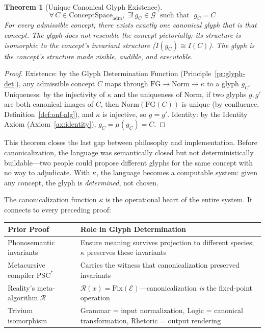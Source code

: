 \documentclass[12pt, letterpaper]{book}
\def\equiv{=}%
\def\mathfrak#1{#1}%
\newtheorem{theorem}{Theorem}[chapter]
\begin{document}
\begin{theorem}[Unique Canonical Glyph Existence]\label{thm:unique-glyph}
\[
\boxed{\forall\, C \in \mathrm{ConceptSpace}_{\mathrm{adm}},\; \exists!\, \mathfrak{g}_C \in \mathcal{G} \;\text{ such that }\; \mathfrak{g}_C \equiv C}
\]
For every admissible concept, there exists exactly one canonical glyph that \textit{is} that concept. The glyph does not resemble the concept pictorially; its structure is isomorphic to the concept's invariant structure ($I(\mathfrak{g}_C) \cong I(C)$). The glyph is the concept's structure made visible, audible, and executable.
\end{theorem}

\begin{proof}
Existence: by the Glyph Determination Function (Principle~\ref{pr:glyph-det}), any admissible concept $C$ maps through $\mathrm{FG} \to \mathrm{Norm} \to \kappa$ to a glyph $\mathfrak{g}_C$. Uniqueness: by the injectivity of $\kappa$ and the uniqueness of $\mathrm{Norm}$, if two glyphs $\mathfrak{g}, \mathfrak{g}'$ are both canonical images of $C$, then $\mathrm{Norm}(\mathrm{FG}(C))$ is unique (by confluence, Definition~\ref{def:onf-alg}), and $\kappa$ is injective, so $\mathfrak{g} = \mathfrak{g}'$. Identity: by the Identity Axiom (Axiom~\ref{ax:identity}), $\mathfrak{g}_C \equiv \mu(\mathfrak{g}_C) \equiv C$.
\end{proof}

This theorem closes the last gap between philosophy and implementation. Before canonicalization, the language was semantically closed but not deterministically buildable---two people could propose different glyphs for the same concept with no way to adjudicate. With $\kappa$, the language becomes a computable system: given any concept, the glyph is \textit{determined}, not chosen.

The canonicalization function $\kappa$ is the operational heart of the entire system. It connects to every preceding proof:

\begin{center}
\begin{tabular}{lp{8cm}}
\toprule
\textbf{Prior Proof} & \textbf{Role in Glyph Determination} \\
\midrule
Phonosemantic invariants & Ensure meaning survives projection to different species; $\kappa$ preserves these invariants \\
Metacursive compiler $\mathrm{PSC}^*$ & Carries the witness that canonicalization preserved invariants \\
Reality's meta-algorithm $\mathcal{R}$ & $\mathcal{R}(x) = \mathrm{Fix}(\mathcal{E})$---canonicalization \textit{is} the fixed-point operation \\
Trivium isomorphism & Grammar = input normalization, Logic = canonical transformation, Rhetoric = output rendering \\
\bottomrule
\end{tabular}
\end{center}
\end{document}
